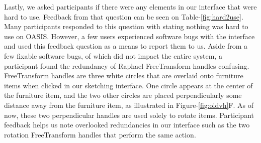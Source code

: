 Lastly, we asked participants if there were any elements in our interface that were hard to use.
Feedback from that question can be seen on Table-\ref{fig:hard2use}.
Many participants responded to this question with stating nothing was hard to use on OASIS.
However, a few users experienced software bugs with the interface and used this feedback question as a means to report them to us.
Aside from a few fixable software bugs, of which did not impact the entire system, a participant found the redundancy of Raphael FreeTransform handles confusing.
FreeTransform handles are three white circles that are overlaid onto furniture items when clicked in our sketching interface.
One circle appears at the center of the furniture item, and the two other circles are placed perpendicularly some distance away from the furniture item, as illustrated in Figure-\ref{fig:oldvh}F.
As of now, these two perpendicular handles are used solely to rotate items.
Participant feedback helps us note overlooked redundancies in our interface such as the two rotation FreeTransform handles that perform the same action.\\

